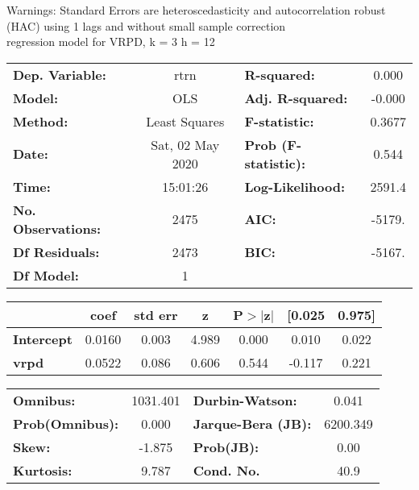 Warnings: \newline
 [1] Standard Errors are heteroscedasticity and autocorrelation robust (HAC) using 1 lags and without small sample correction\\ 

regression model for VRPD, k = 3 h = 12\begin{center}
\begin{tabular}{lclc}
\toprule
\textbf{Dep. Variable:}    &       rtrn       & \textbf{  R-squared:         } &     0.000   \\
\textbf{Model:}            &       OLS        & \textbf{  Adj. R-squared:    } &    -0.000   \\
\textbf{Method:}           &  Least Squares   & \textbf{  F-statistic:       } &    0.3677   \\
\textbf{Date:}             & Sat, 02 May 2020 & \textbf{  Prob (F-statistic):} &    0.544    \\
\textbf{Time:}             &     15:01:26     & \textbf{  Log-Likelihood:    } &    2591.4   \\
\textbf{No. Observations:} &        2475      & \textbf{  AIC:               } &    -5179.   \\
\textbf{Df Residuals:}     &        2473      & \textbf{  BIC:               } &    -5167.   \\
\textbf{Df Model:}         &           1      & \textbf{                     } &             \\
\bottomrule
\end{tabular}
\begin{tabular}{lcccccc}
                   & \textbf{coef} & \textbf{std err} & \textbf{z} & \textbf{P$> |$z$|$} & \textbf{[0.025} & \textbf{0.975]}  \\
\midrule
\textbf{Intercept} &       0.0160  &        0.003     &     4.989  &         0.000        &        0.010    &        0.022     \\
\textbf{vrpd}      &       0.0522  &        0.086     &     0.606  &         0.544        &       -0.117    &        0.221     \\
\bottomrule
\end{tabular}
\begin{tabular}{lclc}
\textbf{Omnibus:}       & 1031.401 & \textbf{  Durbin-Watson:     } &    0.041  \\
\textbf{Prob(Omnibus):} &   0.000  & \textbf{  Jarque-Bera (JB):  } & 6200.349  \\
\textbf{Skew:}          &  -1.875  & \textbf{  Prob(JB):          } &     0.00  \\
\textbf{Kurtosis:}      &   9.787  & \textbf{  Cond. No.          } &     40.9  \\
\bottomrule
\end{tabular}
\end{center}


